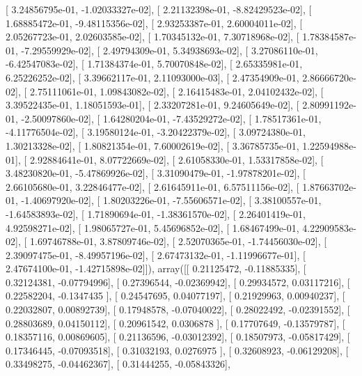 \documentclass{article}
\begin{document}
       [  3.24856795e-01,  -1.02033327e-02],
       [  2.21132398e-01,  -8.82429523e-02],
       [  1.68885472e-01,  -9.48115356e-02],
       [  2.93253387e-01,   2.60004011e-02],
       [  2.05267723e-01,   2.02603585e-02],
       [  1.70345132e-01,   7.30718968e-02],
       [  1.78384587e-01,  -7.29559929e-02],
       [  2.49794309e-01,   5.34938693e-02],
       [  3.27086110e-01,  -6.42547083e-02],
       [  1.71384374e-01,   5.70070848e-02],
       [  2.65335981e-01,   6.25226252e-02],
       [  3.39662117e-01,   2.11093000e-03],
       [  2.47354909e-01,   2.86666720e-02],
       [  2.75111061e-01,   1.09843082e-02],
       [  2.16415483e-01,   2.04102432e-02],
       [  3.39522435e-01,   1.18051593e-01],
       [  2.33207281e-01,   9.24605649e-02],
       [  2.80991192e-01,  -2.50097860e-02],
       [  1.64280204e-01,  -7.43529272e-02],
       [  1.78517361e-01,  -4.11776504e-02],
       [  3.19580124e-01,  -3.20422379e-02],
       [  3.09724380e-01,   1.30213328e-02],
       [  1.80821354e-01,   7.60002619e-02],
       [  3.36785735e-01,   1.22594988e-01],
       [  2.92884641e-01,   8.07722669e-02],
       [  2.61058330e-01,   1.53317858e-02],
       [  3.48230820e-01,  -5.47869926e-02],
       [  3.31090479e-01,  -1.97878201e-02],
       [  2.66105680e-01,   3.22846477e-02],
       [  2.61645911e-01,   6.57511156e-02],
       [  1.87663702e-01,  -1.40697920e-02],
       [  1.80203226e-01,  -7.55606571e-02],
       [  3.38100557e-01,  -1.64583893e-02],
       [  1.71890694e-01,  -1.38361570e-02],
       [  2.26401419e-01,   4.92598271e-02],
       [  1.98065727e-01,   5.45696852e-02],
       [  1.68467499e-01,   4.22909583e-02],
       [  1.69746788e-01,   3.87809746e-02],
       [  2.52070365e-01,  -1.74456030e-02],
       [  2.39097475e-01,  -8.49957196e-02],
       [  2.67473132e-01,  -1.11996677e-01],
       [  2.47674100e-01,  -1.42715898e-02]]), array([[ 0.21125472, -0.11885335],
       [ 0.32124381, -0.07794996],
       [ 0.27396544, -0.02369942],
       [ 0.29934572,  0.03117216],
       [ 0.22582204, -0.1347435 ],
       [ 0.24547695,  0.04077197],
       [ 0.21929963,  0.00940237],
       [ 0.22032807,  0.00892739],
       [ 0.17948578, -0.07040022],
       [ 0.28022492, -0.02391552],
       [ 0.28803689,  0.04150112],
       [ 0.20961542,  0.0306878 ],
       [ 0.17707649, -0.13579787],
       [ 0.18357116,  0.00869605],
       [ 0.21136596, -0.03012392],
       [ 0.18507973, -0.05817429],
       [ 0.17346445, -0.07093518],
       [ 0.31032193,  0.0276975 ],
       [ 0.32608923, -0.06129208],
       [ 0.33498275, -0.04462367],
       [ 0.31444255, -0.05843326],
\end{document}
